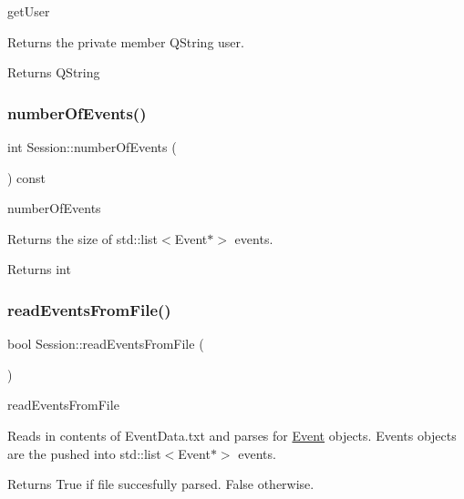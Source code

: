 get\+User 

Returns the private member Q\+String user. \begin{DoxyReturn}{Returns}
Q\+String 
\end{DoxyReturn}
\mbox{\label{class_session_aa6766de9b237384f6eff9ccbdfd8bde9}} 
\subsubsection{\texorpdfstring{number\+Of\+Events()}{numberOfEvents()}}
{\footnotesize\ttfamily int Session\+::number\+Of\+Events (\begin{DoxyParamCaption}{ }\end{DoxyParamCaption}) const}



number\+Of\+Events 

Returns the size of std\+::list$<$\+Event$\ast$$>$ events. \begin{DoxyReturn}{Returns}
int 
\end{DoxyReturn}
\mbox{\label{class_session_aff9fd19eb09a0ac22d3e2c2615f9f9e9}} 
\subsubsection{\texorpdfstring{read\+Events\+From\+File()}{readEventsFromFile()}}
{\footnotesize\ttfamily bool Session\+::read\+Events\+From\+File (\begin{DoxyParamCaption}{ }\end{DoxyParamCaption})}



read\+Events\+From\+File 

Reads in contents of Event\+Data.\+txt and parses for \hyperlink{class_event}{Event} objects. Events objects are the pushed into std\+::list$<$\+Event$\ast$$>$ events. \begin{DoxyReturn}{Returns}
True if file succesfully parsed. False otherwise. 
\end{DoxyReturn}
\mbox{\label{class_session_af095af8449dd10f6fdf3db6d530e109e}} 
